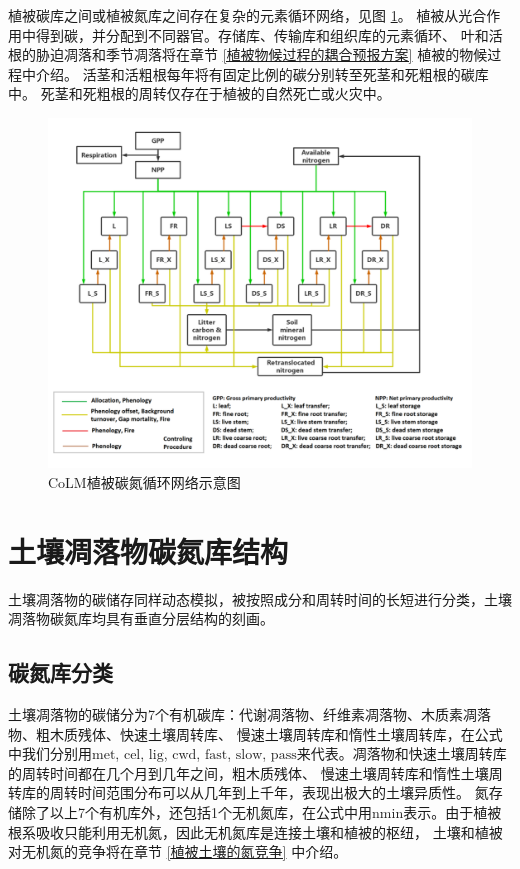 植被碳库之间或植被氮库之间存在复杂的元素循环网络，见图 \ref{fig:CoLM植被碳氮循环网络示意图}。
植被从光合作用中得到碳，并分配到不同器官。存储库、传输库和组织库的元素循环、
叶和活根的胁迫凋落和季节凋落将在章节 \ref{植被物候过程的耦合预报方案} 植被的物候过程中介绍。
活茎和活粗根每年将有固定比例的碳分别转至死茎和死粗根的碳库中。
死茎和死粗根的周转仅存在于植被的自然死亡或火灾中。
{
  \begin{figure}[htbp]
    \centering
    \includegraphics{Figures/碳氮库结构/CoLM植被碳氮循环网络示意图.png}
    \caption{CoLM植被碳氮循环网络示意图 \citep{lu2020full}}
    \label{fig:CoLM植被碳氮循环网络示意图}
  \end{figure}
}

\section{土壤凋落物碳氮库结构}\label{土壤凋落物碳氮库结构}
土壤凋落物的碳储存同样动态模拟，被按照成分和周转时间的长短进行分类，土壤凋落物碳氮库均具有垂直分层结构的刻画。
\subsection{碳氮库分类}\label{碳氮库分类}
土壤凋落物的碳储分为7个有机碳库：代谢凋落物、纤维素凋落物、木质素凋落物、粗木质残体、快速土壤周转库、
慢速土壤周转库和惰性土壤周转库，在公式中我们分别用${\mathrm {met}}$, ${\mathrm {cel}}$, ${\mathrm {lig}}$, ${\mathrm {cwd}}$, ${\mathrm {fast}}$, ${\mathrm {slow}}$, ${\mathrm {pass}}$来代表。凋落物和快速土壤周转库的周转时间都在几个月到几年之间，粗木质残体、
慢速土壤周转库和惰性土壤周转库的周转时间范围分布可以从几年到上千年，表现出极大的土壤异质性。
氮存储除了以上7个有机库外，还包括1个无机氮库，在公式中用${\mathrm {nmin}}$表示。由于植被根系吸收只能利用无机氮，因此无机氮库是连接土壤和植被的枢纽，
土壤和植被对无机氮的竞争将在章节 \ref{植被土壤的氮竞争} 中介绍。


